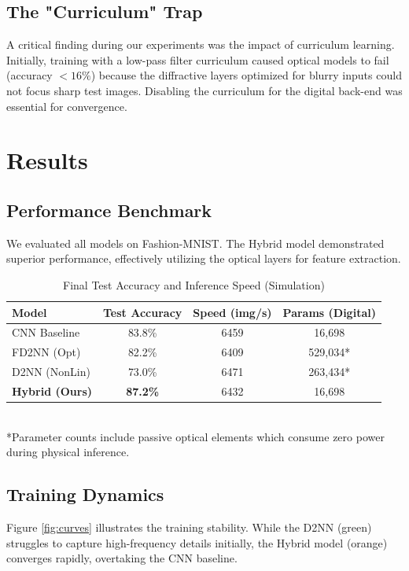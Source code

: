 \documentclass[11pt, a4paper]{article}
\begin{document}
\subsection{The "Curriculum" Trap}
A critical finding during our experiments was the impact of curriculum learning. Initially, training with a low-pass filter curriculum caused optical models to fail (accuracy $<16\%$) because the diffractive layers optimized for blurry inputs could not focus sharp test images. Disabling the curriculum for the digital back-end was essential for convergence.

\section{Results}

\subsection{Performance Benchmark}
We evaluated all models on Fashion-MNIST. The Hybrid model demonstrated superior performance, effectively utilizing the optical layers for feature extraction.

\begin{table}[h]
    \centering
    \caption{Final Test Accuracy and Inference Speed (Simulation)}
    \begin{tabular}{lccc}
        \toprule
        \textbf{Model} & \textbf{Test Accuracy} & \textbf{Speed (img/s)} & \textbf{Params (Digital)} \\
        \midrule
        CNN Baseline & 83.8\% & 6459 & 16,698 \\
        FD2NN (Opt) & 82.2\% & 6409 & 529,034* \\
        D2NN (NonLin) & 73.0\% & 6471 & 263,434* \\
        \textbf{Hybrid (Ours)} & \textbf{87.2\%} & 6432 & 16,698 \\
        \bottomrule
    \end{tabular}
    \\[5pt]
    \small{*Parameter counts include passive optical elements which consume zero power during physical inference.}
\end{table}

\subsection{Training Dynamics}
Figure \ref{fig:curves} illustrates the training stability. While the D2NN (green) struggles to capture high-frequency details initially, the Hybrid model (orange) converges rapidly, overtaking the CNN baseline.
\end{document}

